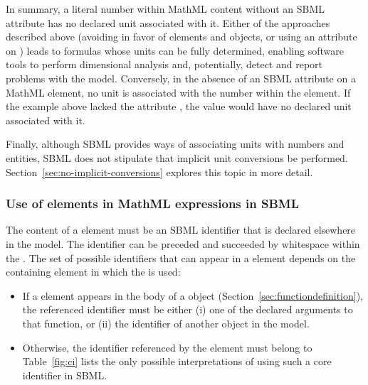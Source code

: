 In summary, a literal number within MathML content without an SBML
 attribute has no declared unit associated with it.
Either of the approaches described above (\ie avoiding 
in favor of  elements and \Parameter objects, or using
an  attribute on ) leads to formulas
whose units can be fully determined, enabling software tools to
perform dimensional analysis and, potentially, detect and report
problems with the model.  Conversely, in the absence of an SBML
 attribute on a MathML  element, no unit is
associated with the number within the  element.  If the
example above lacked the attribute , the value
 would have no declared unit associated with it.

Finally, although SBML provides ways of associating units with
numbers and entities, SBML does not stipulate that implicit unit
conversions be performed.
Section~\ref{sec:no-implicit-conversions} explores this topic in
more detail.


\subsubsection{Use of  elements in MathML expressions in SBML}
\label{sec:ci-token}

The content of a  element must be an SBML identifier
that is declared elsewhere in the model.  The identifier can be
preceded and succeeded by whitespace within the .  The
set of possible identifiers that can appear in a 
element depends on the containing element in which the 
is used:
\begin{itemize}
  
\item If a  element appears in the  body of
  a \FunctionDefinition object
  (Section~\ref{sec:functiondefinition}), the referenced
  identifier must be either (i) one of the declared arguments to
  that function, or (ii) the identifier of another
  \FunctionDefinition object in the model.
  
\item Otherwise, the identifier referenced by the 
  element must belong to 
  Table~\ref{fig:ci} lists the only
  possible interpretations of using such a core identifier in SBML.

\end{itemize}

